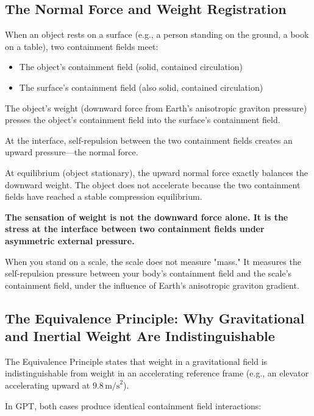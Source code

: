 \documentclass[12pt, a4paper]{article}
\begin{document}
\subsection{The Normal Force and Weight Registration}
\label{subsec:weight_registration}

When an object rests on a surface (e.g., a person standing on the ground, a book on a table), two containment fields meet:

\begin{itemize}
    \item The object's containment field (solid, contained circulation)
    \item The surface's containment field (also solid, contained circulation)
\end{itemize}

The object's weight (downward force from Earth's anisotropic graviton pressure) presses the object's containment field into the surface's containment field.

At the interface, self-repulsion between the two containment fields creates an upward pressure—the normal force.

At equilibrium (object stationary), the upward normal force exactly balances the downward weight. The object does not accelerate because the two containment fields have reached a stable compression equilibrium.

\textbf{The sensation of weight is not the downward force alone. It is the stress at the interface between two containment fields under asymmetric external pressure.}

When you stand on a scale, the scale does not measure "mass." It measures the self-repulsion pressure between your body's containment field and the scale's containment field, under the influence of Earth's anisotropic graviton gradient.

\subsection{The Equivalence Principle: Why Gravitational and Inertial Weight Are Indistinguishable}
\label{subsec:ep_containment}

The Equivalence Principle states that weight in a gravitational field is indistinguishable from weight in an accelerating reference frame (e.g., an elevator accelerating upward at \( 9.8 \, \text{m/s}^2 \)).

In GPT, both cases produce identical containment field interactions:
\end{document}
